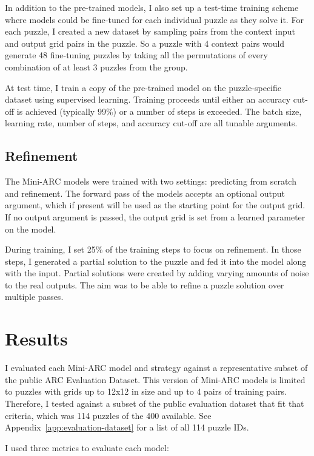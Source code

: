 \documentclass[10pt,twocolumn]{article}
\begin{document}
In addition to the pre-trained models, I also set up a test-time
training scheme where models could be fine-tuned for each individual
puzzle as they solve it. For each puzzle, I created a new dataset by
sampling pairs from the context input and output grid pairs in the
puzzle. So a puzzle with 4 context pairs would generate 48
fine-tuning puzzles by taking all the permutations of every
combination of at least 3 puzzles from the group.

At test time, I train a copy of the pre-trained model on the
puzzle-specific dataset using supervised learning. Training proceeds
until either an accuracy cut-off is achieved (typically 99\%) or a
number of steps is exceeded. The batch size, learning rate, number of
steps, and accuracy cut-off are all tunable arguments.

\subsection{Refinement}

The Mini-ARC models were trained with two settings: predicting from
scratch and refinement. The forward pass of the models accepts an
optional output argument, which if present will be used as the
starting point for the output grid. If no output argument is passed,
the output grid is set from a learned parameter on the model.

During training, I set 25\% of the training steps to focus on
refinement. In those steps, I generated a partial solution to the
puzzle and fed it into the model along with the input. Partial
solutions were created by adding varying amounts of noise to the real
outputs. The aim was to be able to refine a puzzle solution over
multiple passes.

\section{Results}

I evaluated each Mini-ARC model and strategy against a representative
subset of the public ARC Evaluation Dataset. This version of Mini-ARC models
is limited to puzzles with grids up to 12x12 in size and up to 4
pairs of training pairs. Therefore, I tested against a subset of the
public evaluation dataset that fit that criteria, which was 114
puzzles of the 400 available. See
Appendix~\ref{app:evaluation-dataset} for a list of all 114 puzzle IDs.

I used three metrics to evaluate each model:
\end{document}
